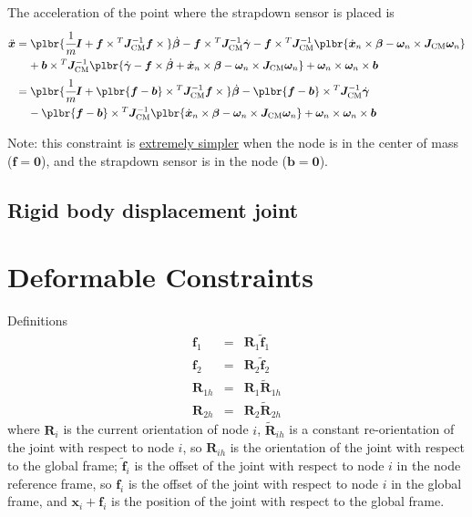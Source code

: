 \documentclass[10pt,fleqn,subeqn]{report}
\newcommand{\T}[1]{\bm{#1}}
\newcommand{\TT}[1]{\bm{#1}}
\begin{document}
The acceleration of the point where the strapdown sensor is placed is
\begin{align}
	\ddot{\T{x}}
	&=
	\plbr{
		\cfrac{1}{m} \TT{I}
		+
		\T{f} \times{}^T \TT{J}_\text{CM}^{-1} \T{f}\times{}
	} \dot{\T{\beta}}
	-
	\T{f}\times{}^T \TT{J}_\text{CM}^{-1} \dot{\T{\gamma}}
	-
	\T{f}\times{}^T \TT{J}_\text{CM}^{-1} \plbr{
		\dot{\T{x}}_n \times \T{\beta}
		-
		\T{\omega}_n \times \TT{J}_\text{CM} \T{\omega}_n
	}
	\nonumber \\ &\mbox{\hphantom{= }}
	+ \T{b}\times{}^T \TT{J}_\text{CM}^{-1} \plbr{
		\dot{\T{\gamma}}
		-
		\T{f}\times\dot{\T{\beta}}
		+
		\dot{\T{x}}_n \times \T{\beta}
		-
		\T{\omega}_n \times \TT{J}_\text{CM} \T{\omega}_n
	}
	+
	\T{\omega}_n \times \T{\omega}_n \times \T{b}
	\nonumber \\
	&=
	\plbr{
		\cfrac{1}{m} \TT{I}
		+
		\plbr{\T{f} - \T{b}}\times{}^T \TT{J}_\text{CM}^{-1} \T{f}\times{}
	} \dot{\T{\beta}}
	-
	\plbr{\T{f} - \T{b}}\times{}^T \TT{J}_\text{CM}^{-1} \dot{\T{\gamma}}
	\nonumber \\ &\mbox{\hphantom{= }}
	-
	\plbr{\T{f} - \T{b}}\times{}^T \TT{J}_\text{CM}^{-1} \plbr{
		\dot{\T{x}}_n \times \T{\beta}
		-
		\T{\omega}_n \times \TT{J}_\text{CM} \T{\omega}_n
	}
	+
	\T{\omega}_n \times \T{\omega}_n \times \T{b}
\end{align}

Note: this constraint is \underline{extremely simpler}
when the node is in the center of mass ($\T{f} = \T{0}$),
and the strapdown sensor is in the node ($\T{b} = \T{0}$).





\subsection{Rigid body displacement joint}


\section{Deformable Constraints}
Definitions
\begin{eqnarray*}
	\T{f}_1 & = & \T{R}_1 \tilde{\T{f}}_1 \\
	\T{f}_2 & = & \T{R}_2 \tilde{\T{f}}_2 \\
	\T{R}_{1h} & = & \T{R}_1 \tilde{\T{R}}_{1h} \\
	\T{R}_{2h} & = & \T{R}_2 \tilde{\T{R}}_{2h}
\end{eqnarray*}
where $\T{R}_i$ is the current orientation of node $i$, 
$\tilde{\T{R}}_{ih}$ is a constant re-orientation of the joint
with respect to node $i$, so $\T{R}_{ih}$ is the orientation
of the joint with respect to the global frame;
$\tilde{\T{f}}_i$ is the offset of the joint with respect to
node $i$ in the node reference frame, so $\T{f}_i$ is the offset 
of the joint with respect to node $i$ in the global frame, and
$\T{x}_i+\T{f}_i$ is the position of the joint with respect 
to the global frame.
\end{document}
